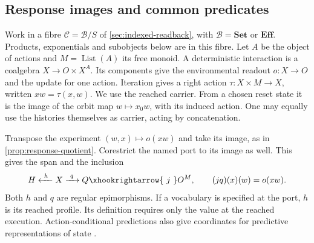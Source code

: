 \documentclass[11pt,a4paper]{article}
\theoremstyle{definition}
\theoremstyle{remark}\newaliascnt{remark}{theorem}
\numberwithin{equation}{section}
\begin{document}
\subsection{Response images and common predicates}
Work in a fibre $\mathcal C=\mathcal B/S$ of \cref{sec:indexed-readback}, with $\mathcal B=\mathbf{Set}$ or $\mathbf{Eff}$. Products, exponentials and subobjects below are in this fibre. Let $A$ be the object of actions and $M=\operatorname{List}(A)$ its free monoid. A deterministic interaction is a coalgebra $X\to O\times X^A$. Its components give the environmental readout $o:X\to O$ and the update for one action. Iteration gives a right action $\tau:X\times M\to X$, written $xw=\tau(x,w)$. We use the reached carrier. From a chosen reset state it is the image of the orbit map $w\mapsto x_0w$, with its induced action. One may equally use the histories themselves as carrier, acting by concatenation.

Transpose the experiment $(w,x)\mapsto o(xw)$ and take its image, as in \cref{prop:response-quotient}. Corestrict the named port to its image as well. This gives the span and the inclusion
\[
 H\xleftarrow{\ h\ } X\xrightarrow{\ q\ } Q
       \xhookrightarrow{\ j\ } O^M,
 \qquad (jq)(x)(w)=o(xw).
\]
Both $h$ and $q$ are regular epimorphisms. If a vocabulary is specified at the port, $h$ is its reached profile. Its definition requires only the value at the reached execution. Action-conditional predictions also give coordinates for predictive representations of state \cite{ground-psr}.
\end{document}
